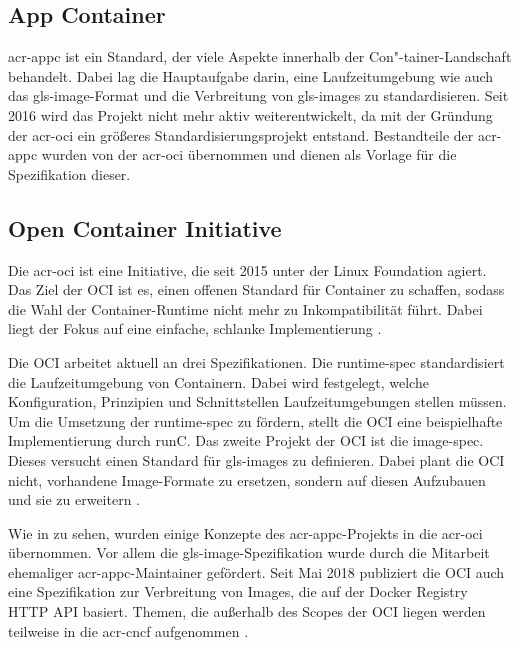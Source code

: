 \subsection{App Container}
\label{sec:appc}
\Gls{acr-appc} ist ein Standard, der viele Aspekte innerhalb der Con"-tainer-Landschaft behandelt. Dabei lag die Hauptaufgabe darin, eine Laufzeitumgebung wie auch das \gls{gls-image}-Format und die Verbreitung von \glspl{gls-image} zu standardisieren. Seit 2016 wird das Projekt nicht mehr aktiv weiterentwickelt, da mit der Gründung der \gls{acr-oci} ein größeres Standardisierungsprojekt entstand. Bestandteile der \gls{acr-appc} wurden von der \gls{acr-oci} übernommen und dienen als Vorlage für die Spezifikation dieser.

\subsection{Open Container Initiative}
\label{sec:oci}
Die \gls{acr-oci} ist eine Initiative, die seit 2015 unter der Linux Foundation agiert. Das Ziel der OCI ist es, einen offenen Standard für Container zu schaffen, sodass die Wahl der Container-Runtime nicht mehr zu Inkompatibilität führt. Dabei liegt der Fokus auf eine einfache, schlanke Implementierung \citep{OpenContainerInitiative}. 

Die OCI arbeitet aktuell an drei Spezifikationen. Die runtime-spec standardisiert die Laufzeitumgebung  von Containern. Dabei wird festgelegt, welche Konfiguration, Prinzipien und Schnittstellen Laufzeitumgebungen stellen müssen. Um die Umsetzung der runtime-spec zu fördern, stellt die OCI eine beispielhafte Implementierung durch runC. Das zweite Projekt der OCI ist die image-spec. Dieses versucht einen Standard für \glspl{gls-image} zu definieren. Dabei plant die OCI nicht, vorhandene Image-Formate zu ersetzen, sondern auf diesen Aufzubauen und sie zu erweitern \citep{OpenContainerInitiative}.

Wie in  zu sehen, wurden einige Konzepte des \gls{acr-appc}-Projekts in die \gls{acr-oci} übernommen. Vor allem die \gls{gls-image}-Spezifikation wurde durch die Mitarbeit ehemaliger \gls{acr-appc}-Maintainer gefördert. Seit Mai 2018 publiziert die OCI auch eine Spezifikation zur Verbreitung von Images, die auf der Docker Registry HTTP API basiert. Themen, die außerhalb des Scopes der OCI liegen werden teilweise in die \gls{acr-cncf} aufgenommen \citep{MakingSenseofContainerStandardsandFoundations:OCICNCFAppcandRkt}.

